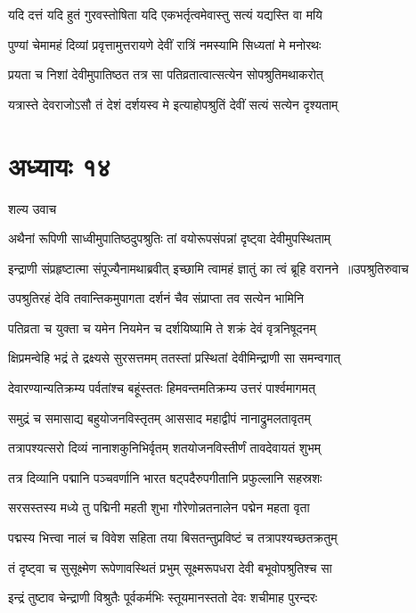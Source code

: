 \twolineshloka
{यदि दत्तं यदि हुतं गुरवस्तोषिता यदि}
{एकभर्तृत्वमेवास्तु सत्यं यद्यस्ति वा मयि}


\twolineshloka
{पुण्यां चेमामहं दिव्यां प्रवृत्तामुत्तरायणे}
{देवीं रात्रिं नमस्यामि सिध्यतां मे मनोरथः}


\twolineshloka
{प्रयता च निशां देवीमुपातिष्ठत तत्र सा}
{पतिव्रतात्वात्सत्येन सोपश्रुतिमथाकरोत्}


\twolineshloka
{यत्रास्ते देवराजोऽसौ तं देशं दर्शयस्व मे}
{इत्याहोपश्रुतिं देवीं सत्यं सत्येन दृश्यताम्}


\chapter{अध्यायः १४}
\twolineshloka
{शल्य उवाच}
{}


\twolineshloka
{अथैनां रूपिणी साध्वीमुपातिष्ठदुपश्रुतिः}
{तां वयोरूपसंपन्नां दृष्ट्वा देवीमुपस्थिताम्}


\threelineshloka
{इन्द्राणी संप्रहृष्टात्मा संपूज्यैनामथाब्रवीत्}
{इच्छामि त्वामहं ज्ञातुं का त्वं ब्रूहि वरानने ॥उपश्रुतिरुवाच}
{}


\twolineshloka
{उपश्रुतिरहं देवि तवान्तिकमुपागता}
{दर्शनं चैव संप्राप्ता तव सत्येन भामिनि}


\twolineshloka
{पतिव्रता च युक्ता च यमेन नियमेन च}
{दर्शयिष्यामि ते शक्रं देवं वृत्रनिषूदनम्}


\twolineshloka
{क्षिप्रमन्वेहि भद्रं ते द्रक्ष्यसे सुरसत्तमम्}
{ततस्तां प्रस्थितां देवीमिन्द्राणी सा समन्वगात्}


\twolineshloka
{देवारण्यान्यतिक्रम्य पर्वतांश्च बहूंस्ततः}
{हिमवन्तमतिक्रम्य उत्तरं पार्श्वमागमत्}


\twolineshloka
{समुद्रं च समासाद्य बहुयोजनविस्तृतम्}
{आससाद महाद्वीपं नानाद्रुमलतावृतम्}


\twolineshloka
{तत्रापश्यत्सरो दिव्यं नानाशकुनिभिर्वृतम्}
{शतयोजनविस्तीर्णं तावदेवायतं शुभम्}


\twolineshloka
{तत्र दिव्यानि पद्मानि पञ्चवर्णानि भारत}
{षट्पदैरुपगीतानि प्रफुल्लानि सहस्रशः}


\twolineshloka
{सरसस्तस्य मध्ये तु पद्मिनी महती शुभा}
{गौरेणोन्नतनालेन पद्मेन महता वृता}


\twolineshloka
{पद्मस्य भित्त्वा नालं च विवेश सहिता तया}
{बिसतन्तुप्रविष्टं च तत्रापश्यच्छतक्रतुम्}


\twolineshloka
{तं दृष्ट्वा च सुसूक्ष्मेण रूपेणावस्थितं प्रभुम्}
{सूक्ष्मरूपधरा देवी बभूवोपश्रुतिश्च सा}


\twolineshloka
{इन्द्रं तुष्टाव चेन्द्राणी विश्रुतैः पूर्वकर्मभिः}
{स्तूयमानस्ततो देवः शचीमाह पुरन्दरः}


